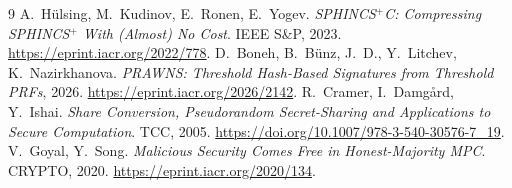 \documentclass[11pt]{article}
\begin{document}
\begin{thebibliography}{9}
 A.~H\"ulsing, M.~Kudinov, E.~Ronen, E.~Yogev. \emph{SPHINCS$^+$C: Compressing SPHINCS$^+$
  With (Almost) No Cost}. IEEE S\&P, 2023. \url{https://eprint.iacr.org/2022/778}.
 D.~Boneh, B.~B\"unz, J.~D., Y.~Litchev, K.~Nazirkhanova. \emph{PRAWNS: Threshold Hash-Based
  Signatures from Threshold PRFs}, 2026. \url{https://eprint.iacr.org/2026/2142}.
 R.~Cramer, I.~Damg{\aa}rd, Y.~Ishai. \emph{Share Conversion, Pseudorandom Secret-Sharing and
  Applications to Secure Computation}. TCC, 2005. \url{https://doi.org/10.1007/978-3-540-30576-7_19}.
 V.~Goyal, Y.~Song. \emph{Malicious Security Comes Free in Honest-Majority MPC}. CRYPTO, 2020.
  \url{https://eprint.iacr.org/2020/134}.
\end{thebibliography}
\end{document}
